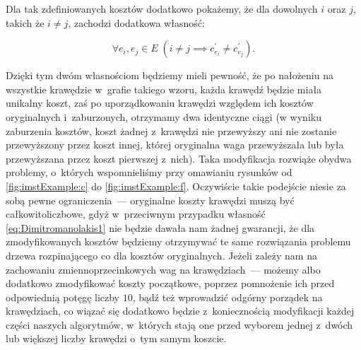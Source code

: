 Dla tak zdefiniowanych kosztów dodatkowo pokażemy, że dla dowolnych $i$ oraz $j$, takich że $i \neq j$, zachodzi dodatkowa własność:

\begin{equation}\label{eq:Dimitromanolakis2}
	\forall e_{i}, e_{j} \in E \; \left( i \neq j \implies c^{\prime}_{e_{i}} \neq c^{\prime}_{e_{j}} \right)\text{.}
\end{equation}

Dzięki tym dwóm własnościom będziemy mieli pewność, że po nałożeniu na wszystkie krawędzie w~grafie takiego wzoru, każda krawędź będzie miała unikalny koszt, zaś po uporządkowaniu krawędzi względem ich kosztów oryginalnych i~zaburzonych, otrzymamy dwa identyczne ciągi (w wyniku zaburzenia kosztów, koszt żadnej z~krawędzi nie przewyższy ani nie zostanie przewyższony przez koszt innej, której oryginalna waga przewyższała lub była przewyższana przez koszt pierwszej z~nich).
Taka modyfikacja rozwiąże obydwa problemy, o~których wspomnieliśmy przy omawianiu rysunków od \ref{fig:imstExample:c} do \ref{fig:imstExample:f}.
Oczywiście takie podejście niesie za sobą pewne ograniczenia~--- oryginalne koszty krawędzi muszą być całkowitoliczbowe, gdyż w~przeciwnym przypadku własność \ref{eq:Dimitromanolakis1} nie będzie dawała nam żadnej gwarancji, że dla zmodyfikowanych kosztów będziemy otrzymywać te same rozwiązania problemu drzewa rozpinającego co dla kosztów oryginalnych.
Jeżeli zależy nam na zachowaniu zmiennoprzecinkowych wag na krawędziach~--- możemy albo dodatkowo zmodyfikować koszty początkowe, poprzez pomnożenie ich przed odpowiednią potęgę liczby $10$, bądź też wprowadzić odgórny porządek na krawędziach, co wiązać się dodatkowo będzie z~koniecznością modyfikacji każdej części naszych algorytmów, w~których stają one przed wyborem jednej z~dwóch lub większej liczby krawędzi o~tym samym koszcie.

